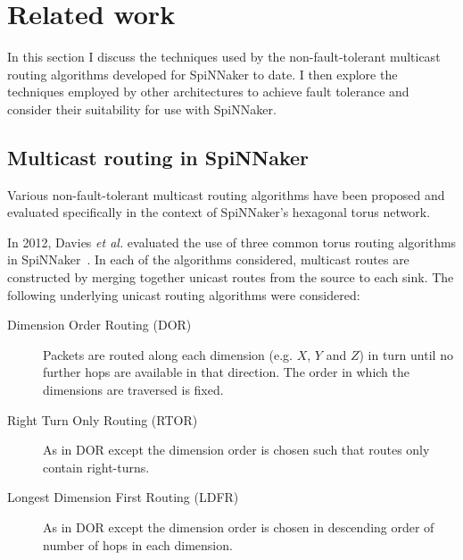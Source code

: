 	\section{Related work}
		
		In this section I discuss the techniques used by the non-fault-tolerant
		multicast routing algorithms developed for SpiNNaker to date. I then
		explore the techniques employed by other architectures to achieve fault
		tolerance and consider their suitability for use with SpiNNaker.
		
		\subsection{Multicast routing in SpiNNaker}
			
			Various non-fault-tolerant multicast routing algorithms have been
			proposed and evaluated specifically in the context of SpiNNaker's
			hexagonal torus network.
			
			In 2012, Davies \emph{et al.} evaluated the use of three common torus
			routing algorithms in SpiNNaker~\cite{davies12}. In each of the
			algorithms considered, multicast routes are constructed by merging
			together unicast routes from the source to each sink. The following
			underlying unicast routing algorithms were considered:
			
			\begin{description}
				
				\item[Dimension Order Routing (DOR)] Packets are routed along each
				dimension (e.g. $X$, $Y$ and $Z$) in turn until no further hops are
				available in that direction.  The order in which the dimensions are
				traversed is fixed.
				
				\item[Right Turn Only Routing (RTOR)] As in DOR except the dimension
				order is chosen such that routes only contain right-turns.
				
				\item[Longest Dimension First Routing (LDFR)] As in DOR except the
				dimension order is chosen in descending order of number of hops in each
				dimension.
				
			\end{description}
			
